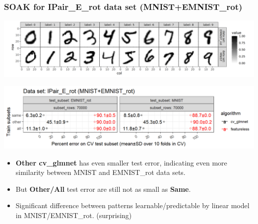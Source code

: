 \documentclass[t]{beamer}
\begin{document}
\begin{frame}
  \frametitle{SOAK for IPair\_E\_rot data set (MNIST+EMNIST\_rot)} 

  \includegraphics[width=\textwidth]{data_Classif_MNIST_other_EMNIST_rot.png}
  
  \includegraphics[width=\textwidth]{MNIST_EMNIST_rot_error_glmnet_featureless_mean_SD_zoom.png} 
  \begin{itemize}
  \item \textbf{Other cv\_glmnet} has even smaller test error,
    indicating even more similarity between MNIST and EMNIST\_rot data
    sets.
  \item But \textbf{Other/All} test error are still not as small as \textbf{Same}.
  \item Significant difference between patterns learnable/predictable
    by linear model in MNIST/EMNIST\_rot. (surprising)
  \end{itemize}
\end{frame}
\end{document}
